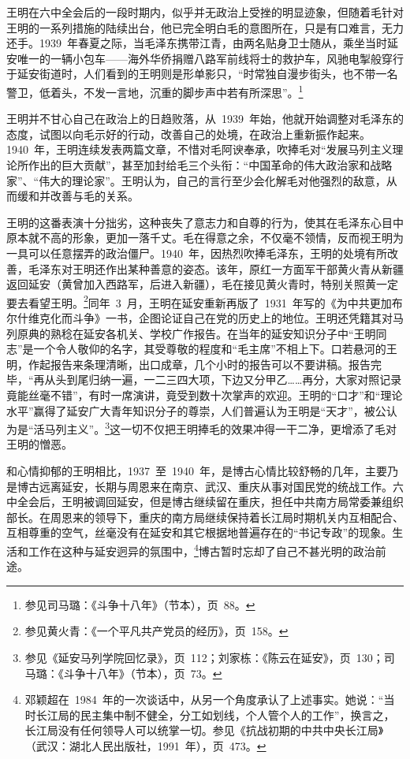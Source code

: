 王明在六中全会后的一段时期内，似乎并无政治上受挫的明显迹象，但随着毛针对王明的一系列措施的陆续出台，他已完全明白毛的意图所在，只是有口难言，无力还手。1939~年春夏之际，当毛泽东携带江青，由两名贴身卫士随从，乘坐当时延安唯一的一辆小包车——海外华侨捐赠八路军前线将士的救护车，风驰电掣般穿行于延安街道时，人们看到的王明则是形单影只，“时常独自漫步街头，也不带一名警卫，低着头，不发一言地，沉重的脚步声中若有所深思”。\footnote{参见司马璐：《斗争十八年》（节本），页~88。}

王明并不甘心自己在政治上的日趋败落，从~1939~年始，他就开始调整对毛泽东的态度，试图以向毛示好的行动，改善自己的处境，在政治上重新振作起来。1940~年，王明连续发表两篇文章，不惜对毛阿谀奉承，吹捧毛对“发展马列主义理论所作出的巨大贡献”，甚至加封给毛三个头衔：“中国革命的伟大政治家和战略家”、“伟大的理论家”。王明认为，自己的言行至少会化解毛对他强烈的敌意，从而缓和并改善与毛的关系。

王明的这番表演十分拙劣，这种丧失了意志力和自尊的行为，使其在毛泽东心目中原本就不高的形象，更加一落千丈。毛在得意之余，不仅毫不领情，反而视王明为一具可以任意摆弄的政治僵尸。1940~年，因热烈吹捧毛泽东，王明的处境有所改善，毛泽东对王明还作出某种善意的姿态。该年，原红一方面军干部黄火青从新疆返回延安（黄曾加入西路军，后进入新疆），毛在接见黄火青时，特别关照黄一定要去看望王明。\footnote{参见黄火青：《一个平凡共产党员的经历》，页~158。}同年~3~月，王明在延安重新再版了~1931~年写的《为中共更加布尔什维克化而斗争》一书，企图论证自己在党的历史上的地位。王明还凭籍其对马列原典的熟稔在延安各机关、学校广作报告。在当年的延安知识分子中“王明同志”是一个令人敬仰的名字，其受尊敬的程度和“毛主席”不相上下。口若悬河的王明，作起报告来条理清晰，出口成章，几个小时的报告可以不要讲稿。报告完毕，“再从头到尾归纳一遍，一二三四大项，下边又分甲乙……再分，大家对照记录竟能丝毫不错”，有时一席演讲，竟受到数十次掌声的欢迎。王明的“口才”和“理论水平”赢得了延安广大青年知识分子的尊崇，人们普遍认为王明是“天才”，被公认为是“活马列主义”。\footnote{参见《延安马列学院回忆录》，页~112；刘家栋：《陈云在延安》，页~130；司马璐：《斗争十八年》（节本），页~73。}这一切不仅把王明捧毛的效果冲得一干二净，更增添了毛对王明的憎恶。

和心情抑郁的王明相比，1937~至~1940~年，是博古心情比较舒畅的几年，主要乃是博古远离延安，长期与周恩来在南京、武汉、重庆从事对国民党的统战工作。六中全会后，王明被调回延安，但是博古继续留在重庆，担任中共南方局常委兼组织部长。在周恩来的领导下，重庆的南方局继续保持着长江局时期机关内互相配合、互相尊重的空气，丝毫没有在延安和其它根据地普遍存在的“书记专政”的现象。生活和工作在这种与延安迥异的氛围中，\footnote{邓颖超在~1984~年的一次谈话中，从另一个角度承认了上述事实。她说：“当时长江局的民主集中制不健全，分工如划线，个人管个人的工作”，换言之，长江局没有任何领导人可以统掌一切。参见《抗战初期的中共中央长江局》（武汉：湖北人民出版社，1991~年），页~473。}博古暂时忘却了自己不甚光明的政治前途。

